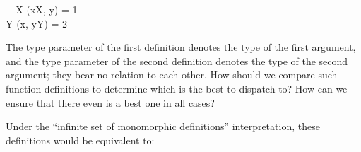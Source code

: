 \documentclass[10pt]{sigplanconf}
\newcommand{\TODO}[1]{\textbf{\emph{\textcolor{red}{TODO}}}: \textsf{\footnotesize #1}}
\newcommand{\T}{\ensuremath{\mathcal{T}}}
\begin{document}
\small
\begin{FortressCode}
{\tt ~~}\+\llbracket{}X \SHORTCUT{<} \rrbracket(x\COLON X, y\COLON {})\COLON {} = 1 \\
  \llbracket{}Y \SHORTCUT{<} \rrbracket(x\COLON {}, y\COLON Y)\COLON {} = 2\-
\end{FortressCode}
\normalsize
The type parameter of the first definition
denotes the type of the first argument, 
and the type parameter of the second definition 
denotes the type of the second argument;
they bear no relation to each other.
How should we compare such function definitions 
to determine which is the best to dispatch to?
How can we ensure that there even is a best one in all cases?



Under the ``infinite set of monomorphic definitions'' interpretation, 
these definitions would be equivalent to:
\end{document}
